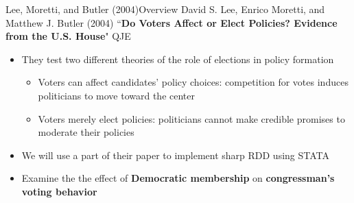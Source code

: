 \documentclass[dvipsnames,hyperref={pdfpagelabels=false}]{beamer}
\begin{document}
\begin{frame}{Lee, Moretti, and Butler (2004)}{Overview}
	David S. Lee, Enrico Moretti, and Matthew J. Butler (2004) ``\textbf{Do Voters Affect or Elect Policies? Evidence from the U.S. House}" QJE
	\vspace{0.2cm}
	\begin{itemize}
		
		\item They test two different theories of the role of elections in policy formation
		\vspace{0.2cm}
			\begin{itemize}
		\item[1] Voters can affect candidates' policy choices: competition for votes induces politicians to
		move toward the center
		\vspace{0.2cm}
		\item[2] Voters merely elect policies: politicians cannot make credible promises to moderate their policies
		\vspace{0.2cm}
			\end{itemize}
		\item We will use a part of their paper to implement sharp RDD using STATA
		\vspace{0.2cm}
		\item Examine the the effect of \textbf{Democratic membership} on \textbf{congressman's voting behavior} 
		
		
		
	\end{itemize}
\end{frame}
\end{document}
